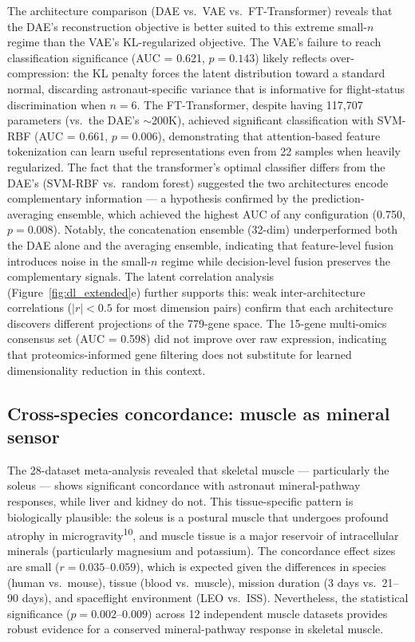 \documentclass[11pt,a4paper]{article}
\begin{document}
The architecture comparison (DAE vs.\ VAE vs.\ FT-Transformer) reveals that the DAE's reconstruction objective is better suited to this extreme small-$n$ regime than the VAE's KL-regularized objective. The VAE's failure to reach classification significance (AUC = 0.621, $p = 0.143$) likely reflects over-compression: the KL penalty forces the latent distribution toward a standard normal, discarding astronaut-specific variance that is informative for flight-status discrimination when $n = 6$. The FT-Transformer, despite having 117,707 parameters (vs.\ the DAE's $\sim$200K), achieved significant classification with SVM-RBF (AUC = 0.661, $p = 0.006$), demonstrating that attention-based feature tokenization can learn useful representations even from 22 samples when heavily regularized. The fact that the transformer's optimal classifier differs from the DAE's (SVM-RBF vs.\ random forest) suggested the two architectures encode complementary information --- a hypothesis confirmed by the prediction-averaging ensemble, which achieved the highest AUC of any configuration (0.750, $p = 0.008$). Notably, the concatenation ensemble (32-dim) underperformed both the DAE alone and the averaging ensemble, indicating that feature-level fusion introduces noise in the small-$n$ regime while decision-level fusion preserves the complementary signals. The latent correlation analysis (Figure~\ref{fig:dl_extended}e) further supports this: weak inter-architecture correlations ($|r| < 0.5$ for most dimension pairs) confirm that each architecture discovers different projections of the 779-gene space. The 15-gene multi-omics consensus set (AUC = 0.598) did not improve over raw expression, indicating that proteomics-informed gene filtering does not substitute for learned dimensionality reduction in this context.

\subsection{Cross-species concordance: muscle as mineral sensor}

The 28-dataset meta-analysis revealed that skeletal muscle --- particularly the soleus --- shows significant concordance with astronaut mineral-pathway responses, while liver and kidney do not. This tissue-specific pattern is biologically plausible: the soleus is a postural muscle that undergoes profound atrophy in microgravity\textsuperscript{10}, and muscle tissue is a major reservoir of intracellular minerals (particularly magnesium and potassium). The concordance effect sizes are small ($r = 0.035$--$0.059$), which is expected given the differences in species (human vs.\ mouse), tissue (blood vs.\ muscle), mission duration (3 days vs.\ 21--90 days), and spaceflight environment (LEO vs.\ ISS). Nevertheless, the statistical significance ($p = 0.002$--$0.009$) across 12 independent muscle datasets provides robust evidence for a conserved mineral-pathway response in skeletal muscle.
\end{document}
